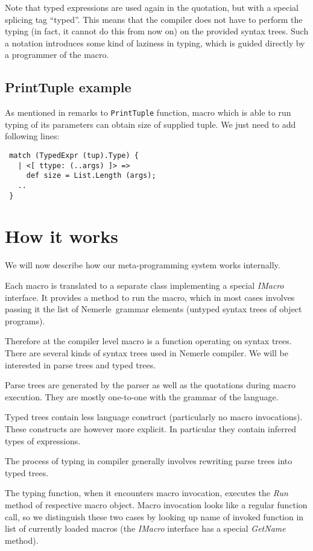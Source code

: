 \documentclass{llncs}
\newcommand{\nem}[0]{Nemerle}
\begin{document}
Note that typed expressions are used again in the quotation, but with a special 
splicing tag ``typed''. This means that the compiler does not have to perform the 
typing (in fact, it cannot do this from now on) on the provided syntax trees. 
Such a notation introduces some kind of laziness in typing, which is guided
directly by a programmer of the macro.

\subsection{PrintTuple example}
As mentioned in remarks to \verb,PrintTuple, function, macro which is able to run 
typing of its parameters can obtain size of supplied tuple. We just need to add
following lines:

\begin{verbatim}
 match (TypedExpr (tup).Type) {
   | <[ ttype: (..args) ]> =>
     def size = List.Length (args);
   ..
 }
\end{verbatim}

\section{How it works}
We will now describe how our meta-programming system works internally. 

Each macro is translated to a separate class implementing a special
\emph{IMacro} interface. It provides a method to run the macro, which
in most cases involves passing it the list of \nem\ grammar elements
(untyped syntax trees of object programs).

Therefore at the compiler level macro is a function operating on
syntax trees. There are several kinds of syntax trees used in Nemerle
compiler. We will be interested in parse trees and typed trees.

Parse trees are generated by the parser as well as the quotations during
macro execution. They are mostly one-to-one with the grammar of the
language.

Typed trees contain less language construct (particularly no macro
invocations). These constructs are however more explicit. In particular
they contain inferred types of expressions.

The process of typing in compiler generally involves rewriting parse
trees into typed trees.

The typing function, when it encounters macro invocation, executes the
\emph{Run} method of respective macro object. Macro invocation looks
like a regular function call, so we distinguish these two cases by
looking up name of invoked function in list of currently loaded macros
(the \emph{IMacro} interface has a special \emph{GetName} method).
\end{document}
